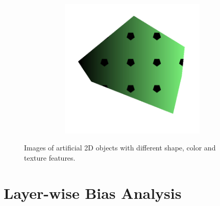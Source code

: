 \begin{figure}[h!]
\begin{subfigure}[b]{0.4\textwidth}
\begin{center}
\begin{subfigure}[b]{0.48\textwidth}
            \end{subfigure}
            \begin{subfigure}[b]{0.5\textwidth}
                \includegraphics[width=\linewidth]{figures/img0005.png}
            \end{subfigure}
        \end{center}
    \end{subfigure}
    \caption{Images of artificial 2D objects with different shape, color and texture features.}
    \label{generated_images}
\end{figure}



\newpage
\section{Layer-wise Bias Analysis}

